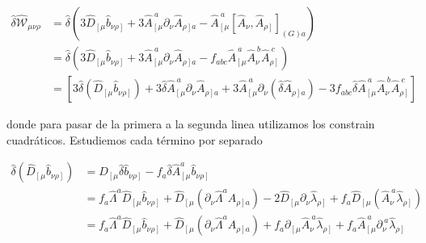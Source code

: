 \documentclass{article}
\numberwithin{equation}{section}
\begin{document}
\begin{equation}
\begin{aligned}
\hat{\delta}\hat{\mathcal{W}}_{\mu \nu \rho} &= \hat{\delta} \left( 3\hat{D}_{\left[ \mu \right.} \hat{b}_{\left. \nu \rho \right]} + 3 \hat{A}_{\left[ \mu\right.}^{\ a} \partial_{\nu} \hat{A}_{\left. \rho \right] a } - \hat{A}_{\left[ \mu \right.}^{\ a} \left[\hat{A}_{\nu}, \hat{A}_{\left.\rho\right]} \right]_{(G) a} \right)\\
&=\hat{\delta} \left( 3\hat{D}_{\left[ \mu \right.} \hat{b}_{\left. \nu \rho \right]} + 3 \hat{A}_{\left[ \mu\right.}^{\ a} \partial_{\nu} \hat{A}_{\left. \rho \right] a } - f_{a b c} \hat{A}_{\left[ \mu \right.}^{\ a} \hat{A}_{\nu}^{\ b}  \hat{A}_{\left.\rho\right]}^{\ c} \right)\\
&=\left[  3 \hat{\delta}\left(\hat{D}_{\left[ \mu \right.} \hat{b}_{\left. \nu \rho \right]}\right) + 3 \hat{\delta} \hat{A}_{\left[ \mu\right.}^{\ a} \partial_{\nu} \hat{A}_{\left. \rho \right] a } + 3 \hat{A}_{\left[ \mu\right.}^{\ a} \partial_{\nu} \left(\hat{\delta} \hat{A}_{\left. \rho \right] a }\right) - 3 f_{a b c} \hat{\delta} \hat{A}_{\left[ \mu \right.}^{\ a} \hat{A}_{\nu}^{\ b}  \hat{A}_{\left.\rho\right]}^{\ c}\right] 
\end{aligned}
\end{equation}

donde para pasar de la primera a la segunda linea utilizamos los constrain cuadráticos. Estudiemos cada término por separado

\begin{equation}\label{hataux1}
\begin{aligned}
\hat{\delta}\left(\hat{D}_{\left[ \mu \right.} \hat{b}_{\left. \nu \rho \right]}\right) &= \hat{D}_{\left[ \mu \right.} \hat{\delta} \hat{b}_{\left. \nu \rho \right]} -f_a \hat{\delta}\hat{A}_{\left[\mu\right.}^a \hat{b}_{\left. \nu \rho \right]}\\
&=f_a \hat{\Lambda}^a \hat{D}_{\left[ \mu \right.} \hat{b}_{\left. \nu \rho \right]} + \hat{D}_{\left[ \mu \right.} \left(\partial_{\nu} \hat{\Lambda}^a \hat{A}_{\left.\rho \right] a} \right) - 2\hat{D}_{\left[ \mu \right.}\partial_{\nu} \hat{\lambda}_{\left.\rho\right]} + f_a \hat{D}_{\left[ \mu \right.} \left( \hat{A}_{\nu}^{\ a} \hat{\lambda}_{\left.\rho\right]} \right)\\
&= f_a \hat{\Lambda}^a \hat{D}_{\left[ \mu \right.} \hat{b}_{\left. \nu \rho \right]} + \hat{D}_{\left[ \mu \right.} \left(\partial_{\nu} \hat{\Lambda}^a \hat{A}_{\left.\rho \right] a} \right) +f_a\partial_{\left[ \mu \right.}\hat{A}_{\nu}^{\ a} \hat{\lambda}_{\left.\rho\right]} + f_a\hat{A}_{\left[ \mu \right.}^{\ a}\partial_{\nu}^{\ a} \hat{\lambda}_{\left.\rho\right]}
\end{aligned}
\end{equation}
\end{document}
